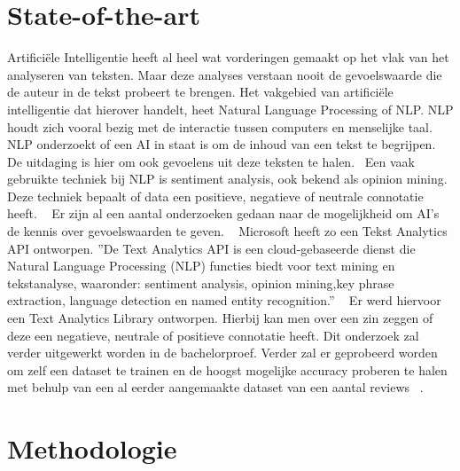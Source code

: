 \section{State-of-the-art}
\label{sec:state-of-the-art}

Artificiële Intelligentie heeft al heel wat vorderingen gemaakt op het vlak van het analyseren van teksten. Maar deze analyses verstaan nooit de gevoelswaarde die de auteur in de tekst probeert te brengen. 
Het vakgebied van artificiële intelligentie dat hierover handelt, heet Natural Language Processing of NLP. NLP houdt zich vooral bezig met de interactie tussen computers en menselijke taal. NLP onderzoekt of een AI in staat is om de inhoud van een tekst te begrijpen. De uitdaging is hier om ook gevoelens uit deze teksten te halen.~\autocite{Knight1997}
Een vaak gebruikte techniek bij NLP is sentiment analysis, ook bekend als opinion mining. Deze techniek bepaalt of data een positieve, negatieve of neutrale connotatie heeft. ~\autocite{MonkeyLearn2020}
Er zijn al een aantal onderzoeken gedaan naar de mogelijkheid om AI’s de kennis over gevoelswaarden te geven. ~\autocite{ChewYean2015} Microsoft heeft zo een Tekst Analytics API ontworpen. ''De Text Analytics API is een cloud-gebaseerde dienst die Natural Language Processing (NLP) functies biedt voor text mining en tekstanalyse, waaronder: sentiment analysis, opinion mining,key phrase extraction, language detection en named entity recognition.'' ~\autocite{Microsoft2020} Er werd hiervoor een  Text Analytics Library ontworpen. Hierbij kan men over een zin zeggen of deze een negatieve, neutrale of positieve connotatie heeft. Dit onderzoek zal verder uitgewerkt worden in de bachelorproef.
Verder zal er geprobeerd worden om zelf een dataset te trainen en de hoogst mogelijke accuracy proberen te halen met behulp van een al eerder aangemaakte dataset van een aantal reviews ~\autocite{Minqing2004}. 




\section{Methodologie}
\label{sec:methodologie}

